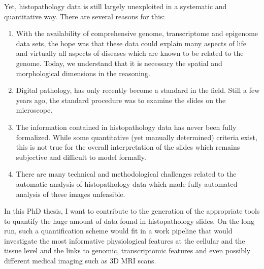 \documentclass[a4paper,10pt]{article}
\begin{document}
Yet, histopathology data is still largely unexploited in a systematic and
quantitative way. There are several reasons for this: 
\begin{enumerate}
\item With the
availability of comprehensive genome, transcriptome and epigenome data
sets, the hope was that these data could explain many aspects of life
and virtually all aspects of diseases which are known to be related to
the genome. Today, we understand that it is necessary the spatial and
morphological dimensions in the reasoning. 
\item Digital pathology,
has only recently become a standard in the field. Still a few years
ago, the standard
procedure was to examine the slides on the
microscope. 
\item The information
contained in histopathology data has never been fully
formalized. While some quantitative (yet manually determined) criteria
exist, this is not true for the overall interpretation of the slides
which remains subjective and difficult to model formally. 
\item There are many technical and methodological challenges related
  to the automatic analysis of histopathology data which made fully
  automated analysis of these images unfeasible. 
\end{enumerate}

%
%

In this PhD thesis, I want to contribute to the generation of the
appropriate tools to quantify the huge amount of data found in
histopathology slides. On the long run, such a
 quantification scheme would fit in a work pipeline that would
 investigate the most informative physiological features at the
 cellular and the tissue level and the links
 to genomic, transcriptomic features and even possibly different
 medical imaging such as 3D MRI scans. 
 
\end{document}
